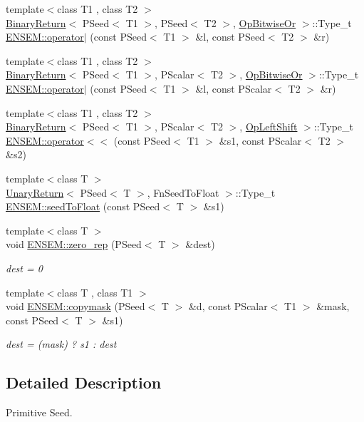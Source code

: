 \begin{DoxyCompactItemize}
{\footnotesize template$<$class T1 , class T2 $>$ }\\\mbox{\hyperlink{structBinaryReturn}{Binary\+Return}}$<$ P\+Seed$<$ T1 $>$, P\+Seed$<$ T2 $>$, \mbox{\hyperlink{structOpBitwiseOr}{Op\+Bitwise\+Or}} $>$\+::Type\+\_\+t \mbox{\hyperlink{group__primseed_gafffac24485a71eb45df5a8073ab12746}{E\+N\+S\+E\+M\+::operator$\vert$}} (const P\+Seed$<$ T1 $>$ \&l, const P\+Seed$<$ T2 $>$ \&r)
\item 
{\footnotesize template$<$class T1 , class T2 $>$ }\\\mbox{\hyperlink{structBinaryReturn}{Binary\+Return}}$<$ P\+Seed$<$ T1 $>$, P\+Scalar$<$ T2 $>$, \mbox{\hyperlink{structOpBitwiseOr}{Op\+Bitwise\+Or}} $>$\+::Type\+\_\+t \mbox{\hyperlink{group__primseed_ga65b26c68c77d19a64ae5896efce8b37c}{E\+N\+S\+E\+M\+::operator$\vert$}} (const P\+Seed$<$ T1 $>$ \&l, const P\+Scalar$<$ T2 $>$ \&r)
\item 
{\footnotesize template$<$class T1 , class T2 $>$ }\\\mbox{\hyperlink{structBinaryReturn}{Binary\+Return}}$<$ P\+Seed$<$ T1 $>$, P\+Scalar$<$ T2 $>$, \mbox{\hyperlink{structOpLeftShift}{Op\+Left\+Shift}} $>$\+::Type\+\_\+t \mbox{\hyperlink{group__primseed_ga2c9462b410a1897e81847c2ca630c0fd}{E\+N\+S\+E\+M\+::operator$<$$<$}} (const P\+Seed$<$ T1 $>$ \&s1, const P\+Scalar$<$ T2 $>$ \&s2)
\item 
{\footnotesize template$<$class T $>$ }\\\mbox{\hyperlink{structUnaryReturn}{Unary\+Return}}$<$ P\+Seed$<$ T $>$, Fn\+Seed\+To\+Float $>$\+::Type\+\_\+t \mbox{\hyperlink{group__primseed_gace5eb402052ee22e28bfd72ab7e92194}{E\+N\+S\+E\+M\+::seed\+To\+Float}} (const P\+Seed$<$ T $>$ \&s1)
\item 
{\footnotesize template$<$class T $>$ }\\void \mbox{\hyperlink{group__primseed_ga7f820f9e98c02626f49ea005894fdc65}{E\+N\+S\+E\+M\+::zero\+\_\+rep}} (P\+Seed$<$ T $>$ \&dest)
\begin{DoxyCompactList}\small\item\em dest = 0 \end{DoxyCompactList}\item 
{\footnotesize template$<$class T , class T1 $>$ }\\void \mbox{\hyperlink{group__primseed_gaa67a317a379bde0b069fba2359e59e2e}{E\+N\+S\+E\+M\+::copymask}} (P\+Seed$<$ T $>$ \&d, const P\+Scalar$<$ T1 $>$ \&mask, const P\+Seed$<$ T $>$ \&s1)
\begin{DoxyCompactList}\small\item\em dest = (mask) ? s1 \+: dest \end{DoxyCompactList}\end{DoxyCompactItemize}


\subsection{Detailed Description}
Primitive Seed. 

